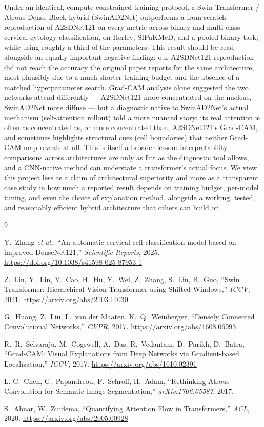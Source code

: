 \documentclass[10pt,twocolumn]{article}
\begin{document}
Under an identical, compute-constrained training protocol, a Swin Transformer / Atrous Dense Block hybrid (SwinAD2Net) outperforms a from-scratch reproduction of A2SDNet121 on every metric across binary and multi-class cervical cytology classification, on Herlev, SIPaKMeD, and a pooled binary task, while using roughly a third of the parameters. This result should be read alongside an equally important negative finding: our A2SDNet121 reproduction did not reach the accuracy the original paper reports for the same architecture, most plausibly due to a much shorter training budget and the absence of a matched hyperparameter search. Grad-CAM analysis alone suggested the two networks attend differently --- A2SDNet121 more concentrated on the nucleus, SwinAD2Net more diffuse --- but a diagnostic native to SwinAD2Net's actual mechanism (self-attention rollout) told a more nuanced story: its real attention is often as concentrated as, or more concentrated than, A2SDNet121's Grad-CAM, and sometimes highlights structural cues (cell boundaries) that neither Grad-CAM map reveals at all. This is itself a broader lesson: interpretability comparisons across architectures are only as fair as the diagnostic tool allows, and a CNN-native method can understate a transformer's actual focus. We view this project less as a claim of architectural superiority and more as a transparent case study in how much a reported result depends on training budget, per-model tuning, and even the choice of explanation method, alongside a working, tested, and reasonably efficient hybrid architecture that others can build on.

\begin{thebibliography}{9}

Y.~Zhang \emph{et al.}, ``An automatic cervical cell classification model based on improved DenseNet121,'' \emph{Scientific Reports}, 2025. \url{https://doi.org/10.1038/s41598-025-87953-1}

Z.~Liu, Y.~Lin, Y.~Cao, H.~Hu, Y.~Wei, Z.~Zhang, S.~Lin, B.~Guo, ``Swin Transformer: Hierarchical Vision Transformer using Shifted Windows,'' \emph{ICCV}, 2021. \url{https://arxiv.org/abs/2103.14030}

G.~Huang, Z.~Liu, L.~van der Maaten, K.~Q.~Weinberger, ``Densely Connected Convolutional Networks,'' \emph{CVPR}, 2017. \url{https://arxiv.org/abs/1608.06993}

R.~R.~Selvaraju, M.~Cogswell, A.~Das, R.~Vedantam, D.~Parikh, D.~Batra, ``Grad-CAM: Visual Explanations from Deep Networks via Gradient-based Localization,'' \emph{ICCV}, 2017. \url{https://arxiv.org/abs/1610.02391}

L.-C.~Chen, G.~Papandreou, F.~Schroff, H.~Adam, ``Rethinking Atrous Convolution for Semantic Image Segmentation,'' \emph{arXiv:1706.05587}, 2017.

S.~Abnar, W.~Zuidema, ``Quantifying Attention Flow in Transformers,'' \emph{ACL}, 2020. \url{https://arxiv.org/abs/2005.00928}

\end{thebibliography}
\end{document}
